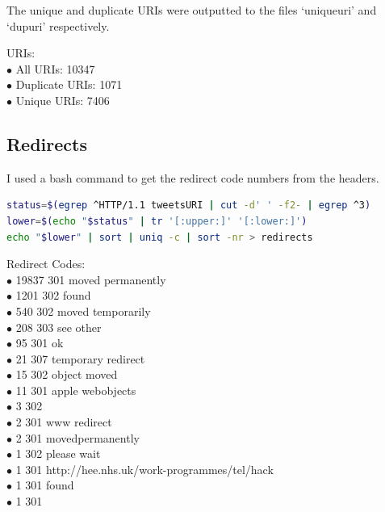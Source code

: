 \documentclass[12pt]{article}
\begin{document}
The unique and duplicate URIs were outputted to the files `uniqueuri' and `dupuri' respectively.

URIs:\\
$\bullet$  All URIs: 10347\\
$\bullet$  Duplicate URIs: 1071\\
$\bullet$  Unique URIs: 7406

\subsection{Redirects}

I used a bash command to get the redirect code numbers from the headers.

\begin{lstlisting}[language=bash,caption={bash code}]
status=$(egrep ^HTTP/1.1 tweetsURI | cut -d' ' -f2- | egrep ^3)
lower=$(echo "$status" | tr '[:upper:]' '[:lower:]')
echo "$lower" | sort | uniq -c | sort -nr > redirects
\end{lstlisting}

Redirect Codes:\\
$\bullet$  19837 301 moved permanently\\
$\bullet$   1201 302 found\\
$\bullet$    540 302 moved temporarily\\
$\bullet$    208 303 see other\\
$\bullet$     95 301 ok\\
$\bullet$     21 307 temporary redirect\\
$\bullet$     15 302 object moved\\
$\bullet$     11 301 apple webobjects\\
$\bullet$      3 302\\
$\bullet$      2 301 www redirect\\
$\bullet$      2 301 movedpermanently\\
$\bullet$      1 302 please wait\\
$\bullet$      1 301 http://hee.nhs.uk/work-programmes/tel/hack\\
$\bullet$      1 301 found\\
$\bullet$      1 301
\end{document}
